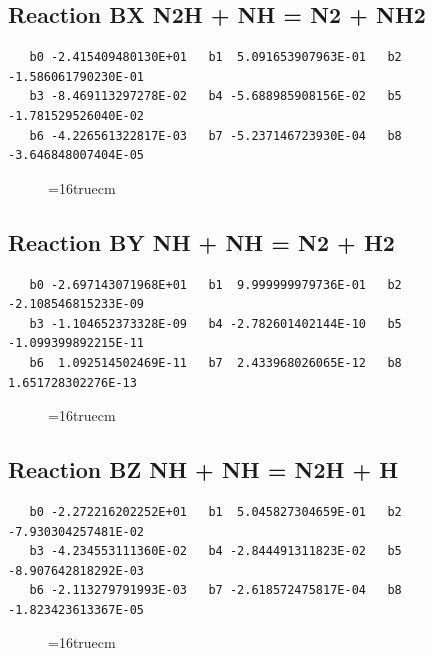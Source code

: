 \documentclass[12pt,dvipdfm]{article}
\begin{document}
\subsection{
Reaction BX N2H + NH = N2 + NH2 }
\begin{small}\begin{verbatim}
   b0 -2.415409480130E+01   b1  5.091653907963E-01   b2 -1.586061790230E-01
   b3 -8.469113297278E-02   b4 -5.688985908156E-02   b5 -1.781529526040E-02
   b6 -4.226561322817E-03   b7 -5.237146723930E-04   b8 -3.646848007404E-05
\end{verbatim}\end{small}
\begin{figure}[h!] \label{n2rates}
\epsfxsize=16truecm
\end{figure}
\newpage

\subsection{
Reaction BY NH + NH = N2 + H2 }
\begin{small}\begin{verbatim}
   b0 -2.697143071968E+01   b1  9.999999979736E-01   b2 -2.108546815233E-09
   b3 -1.104652373328E-09   b4 -2.782601402144E-10   b5 -1.099399892215E-11
   b6  1.092514502469E-11   b7  2.433968026065E-12   b8  1.651728302276E-13
\end{verbatim}\end{small}
\begin{figure}[h!] \label{n2rates}
\epsfxsize=16truecm
\end{figure}
\newpage

\subsection{
Reaction BZ NH + NH = N2H + H }
\begin{small}\begin{verbatim}
   b0 -2.272216202252E+01   b1  5.045827304659E-01   b2 -7.930304257481E-02
   b3 -4.234553111360E-02   b4 -2.844491311823E-02   b5 -8.907642818292E-03
   b6 -2.113279791993E-03   b7 -2.618572475817E-04   b8 -1.823423613367E-05
\end{verbatim}\end{small}
\begin{figure}[h!] \label{n2rates}
\epsfxsize=16truecm
\end{figure}
\newpage
\end{document}
